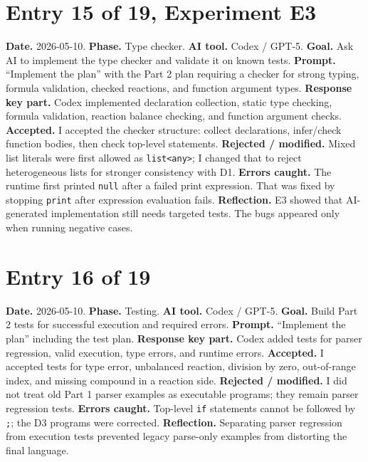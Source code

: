 \documentclass[11pt,a4paper]{article}
\newcommand{\code}[1]{\texttt{#1}}
\begin{document}
\section*{Entry 15 of 19, Experiment E3}
\textbf{Date.} 2026-05-10.
\textbf{Phase.} Type checker.
\textbf{AI tool.} Codex / GPT-5.
\textbf{Goal.} Ask AI to implement the type checker and validate it on known tests.
\textbf{Prompt.} ``Implement the plan'' with the Part 2 plan requiring a checker for strong typing, formula validation, checked reactions, and function argument types.
\textbf{Response key part.} Codex implemented declaration collection, static type checking, formula validation, reaction balance checking, and function argument checks.
\textbf{Accepted.} I accepted the checker structure: collect declarations, infer/check function bodies, then check top-level statements.
\textbf{Rejected / modified.} Mixed list literals were first allowed as \code{list<any>}; I changed that to reject heterogeneous lists for stronger consistency with D1.
\textbf{Errors caught.} The runtime first printed \code{null} after a failed print expression. That was fixed by stopping \code{print} after expression evaluation fails.
\textbf{Reflection.} E3 showed that AI-generated implementation still needs targeted tests. The bugs appeared only when running negative cases.

\section*{Entry 16 of 19}
\textbf{Date.} 2026-05-10.
\textbf{Phase.} Testing.
\textbf{AI tool.} Codex / GPT-5.
\textbf{Goal.} Build Part 2 tests for successful execution and required errors.
\textbf{Prompt.} ``Implement the plan'' including the test plan.
\textbf{Response key part.} Codex added tests for parser regression, valid execution, type errors, and runtime errors.
\textbf{Accepted.} I accepted tests for type error, unbalanced reaction, division by zero, out-of-range index, and missing compound in a reaction side.
\textbf{Rejected / modified.} I did not treat old Part 1 parser examples as executable programs; they remain parser regression tests.
\textbf{Errors caught.} Top-level \code{if} statements cannot be followed by \code{;}; the D3 programs were corrected.
\textbf{Reflection.} Separating parser regression from execution tests prevented legacy parse-only examples from distorting the final language.
\end{document}

